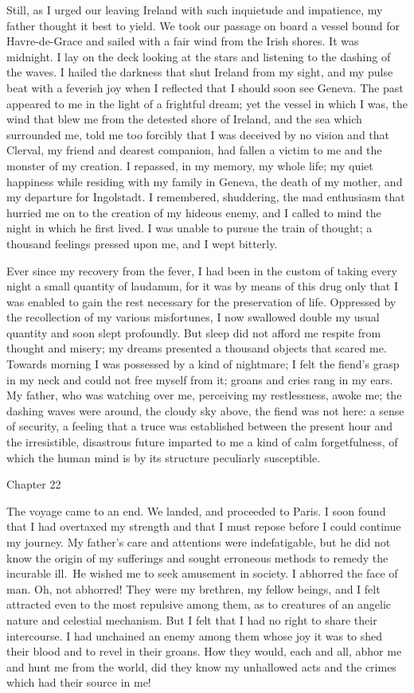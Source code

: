 \documentclass[12pt,openright]{book}
\begin{document}
Still, as I urged our leaving Ireland with such inquietude and impatience, my father thought it best to yield. We took our passage on board a vessel bound for Havre-de-Grace and sailed with a fair wind from the Irish shores. It was midnight. I lay on the deck looking at the stars and listening to the dashing of the waves. I hailed the darkness that shut Ireland from my sight, and my pulse beat with a feverish joy when I reflected that I should soon see Geneva. The past appeared to me in the light of a frightful dream; yet the vessel in which I was, the wind that blew me from the detested shore of Ireland, and the sea which surrounded me, told me too forcibly that I was deceived by no vision and that Clerval, my friend and dearest companion, had fallen a victim to me and the monster of my creation. I repassed, in my memory, my whole life; my quiet happiness while residing with my family in Geneva, the death of my mother, and my departure for Ingolstadt. I remembered, shuddering, the mad enthusiasm that hurried me on to the creation of my hideous enemy, and I called to mind the night in which he first lived. I was unable to pursue the train of thought; a thousand feelings pressed upon me, and I wept bitterly.

Ever since my recovery from the fever, I had been in the custom of taking every night a small quantity of laudanum, for it was by means of this drug only that I was enabled to gain the rest necessary for the preservation of life. Oppressed by the recollection of my various misfortunes, I now swallowed double my usual quantity and soon slept profoundly. But sleep did not afford me respite from thought and misery; my dreams presented a thousand objects that scared me. Towards morning I was possessed by a kind of nightmare; I felt the fiend’s grasp in my neck and could not free myself from it; groans and cries rang in my ears. My father, who was watching over me, perceiving my restlessness, awoke me; the dashing waves were around, the cloudy sky above, the fiend was not here: a sense of security, a feeling that a truce was established between the present hour and the irresistible, disastrous future imparted to me a kind of calm forgetfulness, of which the human mind is by its structure peculiarly susceptible.

Chapter 22

The voyage came to an end. We landed, and proceeded to Paris. I soon found that I had overtaxed my strength and that I must repose before I could continue my journey. My father’s care and attentions were indefatigable, but he did not know the origin of my sufferings and sought erroneous methods to remedy the incurable ill. He wished me to seek amusement in society. I abhorred the face of man. Oh, not abhorred! They were my brethren, my fellow beings, and I felt attracted even to the most repulsive among them, as to creatures of an angelic nature and celestial mechanism. But I felt that I had no right to share their intercourse. I had unchained an enemy among them whose joy it was to shed their blood and to revel in their groans. How they would, each and all, abhor me and hunt me from the world, did they know my unhallowed acts and the crimes which had their source in me!
\end{document}

